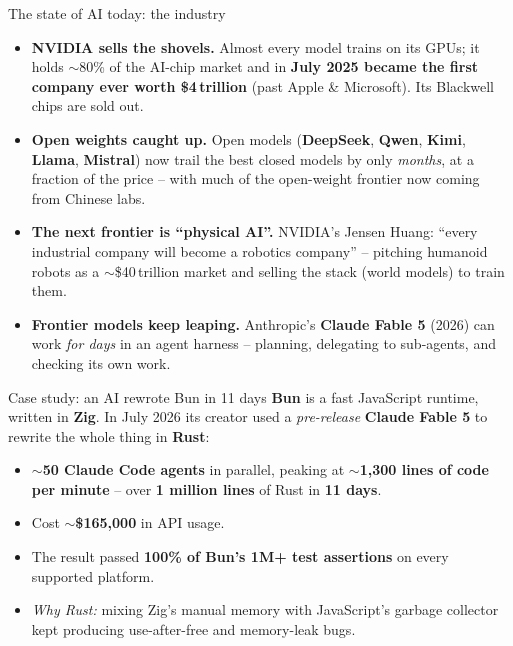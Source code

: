 \documentclass[aspectratio=43]{beamer}
\begin{document}
\begin{frame}{The state of AI today: the industry}
  \begin{itemize}\small
    \item \textbf{NVIDIA sells the shovels.} Almost every model trains on its GPUs; it holds
      $\sim$80\% of the AI-chip market and in \textbf{July 2025 became the first company ever
      worth \$4\,trillion} (past Apple \& Microsoft). Its Blackwell chips are sold out.
    \item \textbf{Open weights caught up.} Open models (\textbf{DeepSeek}, \textbf{Qwen},
      \textbf{Kimi}, \textbf{Llama}, \textbf{Mistral}) now trail the best closed models by only
      \emph{months}, at a fraction of the price -- with much of the open-weight frontier now
      coming from Chinese labs.
    \item \textbf{The next frontier is ``physical AI''.} NVIDIA's Jensen Huang: ``every
      industrial company will become a robotics company'' -- pitching humanoid robots as a
      $\sim$\$40\,trillion market and selling the stack (world models) to train them.
    \item \textbf{Frontier models keep leaping.} Anthropic's \textbf{Claude Fable 5} (2026) can
      work \emph{for days} in an agent harness -- planning, delegating to sub-agents, and
      checking its own work.
  \end{itemize}
  \vfill
\end{frame}

\begin{frame}{Case study: an AI rewrote Bun in 11 days}
  \textbf{Bun} is a fast JavaScript runtime, written in \textbf{Zig}. In July 2026 its creator
  used a \emph{pre-release} \textbf{Claude Fable 5} to rewrite the whole thing in \textbf{Rust}:
  \vskip 4pt
  \begin{itemize}\small
    \item $\sim$\textbf{50 Claude Code agents} in parallel, peaking at $\sim$\textbf{1{,}300
      lines of code per minute} -- over \textbf{1 million lines} of Rust in \textbf{11 days}.
    \item Cost $\sim$\textbf{\$165{,}000} in API usage.
    \item The result passed \textbf{100\% of Bun's 1M+ test assertions} on every supported
      platform.
    \item \emph{Why Rust:} mixing Zig's manual memory with JavaScript's garbage collector kept
      producing use-after-free and memory-leak bugs.
  \end{itemize}
  \vfill
\end{frame}
\end{document}
